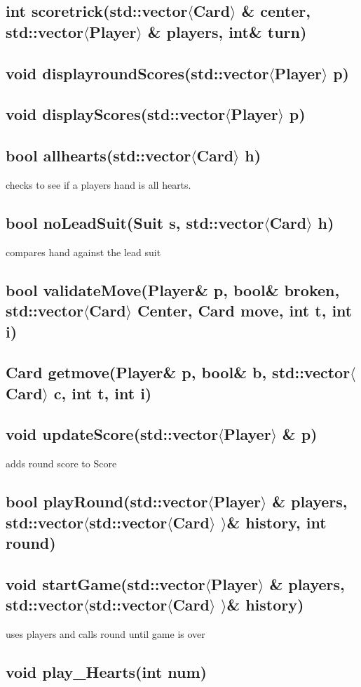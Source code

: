 \documentclass[]{scrartcl}
\begin{document}
\subsection{int scoretrick(std::vector$\langle$Card$\rangle$ \& center, std::vector$\langle$Player$\rangle$ \& players, int\& turn)}
\subsection{void displayroundScores(std::vector$\langle$Player$\rangle$ p)}
\subsection{void displayScores(std::vector$\langle$Player$\rangle$  p)}
\subsection{bool allhearts(std::vector$\langle$Card$\rangle$ h)  }
	checks to see if a players hand is all hearts.
\subsection{bool noLeadSuit(Suit s, std::vector$\langle$Card$\rangle$ h) }
	 compares hand against the lead suit
\subsection{bool validateMove(Player\& p, bool\& broken, std::vector$\langle$Card$\rangle$  Center, Card move, int t, int i)}
\subsection{Card getmove(Player\& p, bool\& b, std::vector$\langle$Card$\rangle$  c, int t, int i)}
\subsection{void updateScore(std::vector$\langle$Player$\rangle$ \& p)}
	adds round score to Score
\subsection{bool playRound(std::vector$\langle$Player$\rangle$ \& players, std::vector$\langle$std::vector$\langle$Card$\rangle$ $\rangle$\& history, int round)}
\subsection{void startGame(std::vector$\langle$Player$\rangle$ \& players, std::vector$\langle$std::vector$\langle$Card$\rangle$ $\rangle$\& history) }
	 uses players and calls round until game is over
\subsection{void play\_Hearts(int num)}
\end{document}
